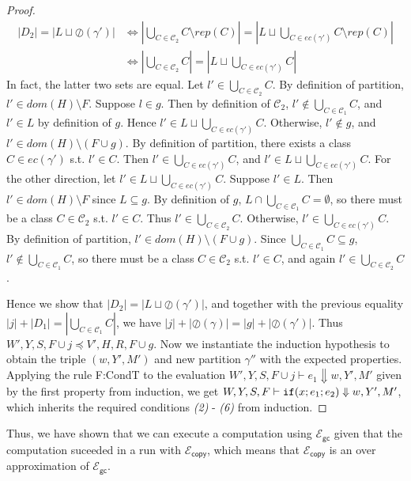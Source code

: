 \documentclass{easychair}
\newcommand{\ms}[1]{\ensuremath{\mathsf{#1}}}
\newcounter{rule}
\newcommand{\oh}[1]{\oslash(#1)}
\newcommand{\gcSem}{\ensuremath{\mathcal{E}_{\ms{gc}}}}
\newcommand{\copySem}{\ensuremath{\mathcal{E}_{\ms{copy}}}}
\theoremstyle{definition}
\begin{document}
\begin{proof}
\begin{align*}
      |D_2| = |L \sqcup \oh{\gamma'}|
      &\iff |\bigcup_{C  \in \mathcal{C}_2} C \setminus rep(C)| = 
			|L \sqcup \bigcup_{C \in ec(\gamma')} C \setminus rep(C)|\\
      &\iff |\bigcup_{C  \in \mathcal{C}_2} C| = 
        |L \sqcup \bigcup_{C \in ec(\gamma')} C|
  \end{align*}
		In fact, the latter two sets are equal. 
		Let $l' \in \bigcup_{C  \in \mathcal{C}_2} C$. 
		By definition of partition, $l' \in dom(H) \setminus F$. Suppose $ l \in g$. 
		Then by definition of $\mathcal{C}_2$, $l' \notin \bigcup_{C \in \mathcal{C}_1} C$, 
    and $l' \in L$ by definition of $g$. Hence 
    $l' \in L \sqcup \bigcup_{C \in ec(\gamma')} C$. 
		Otherwise,  $l' \notin g$, and $l' \in dom(H) \setminus (F \cup g)$. 
		By definition of partition, there exists a class $C \in ec(\gamma')$ s.t.
                $l' \in C$.
		Then $l' \in \bigcup_{C \in ec(\gamma')} C$, and
		$l' \in L \sqcup \bigcup_{C \in ec(\gamma')} C$.
		For the other direction, let $ l' \in L \sqcup \bigcup_{C \in ec(\gamma')} C$.
		Suppose $l' \in L$. Then $l' \in dom(H) \setminus F$ since $L \subseteq g$.
    By definition of $g$, $L \cap  \bigcup_{C \in \mathcal{C}_1} C = \emptyset$, so
    there must be a class $C \in \mathcal{C}_2$ s.t. $l' \in C$. Thus 
    $l' \in \bigcup_{C \in \mathcal{C}_2} C$.
    Otherwise, $l' \in \bigcup_{C \in ec(\gamma')} C$. 
    By definition of partition, $l' \in dom(H) \setminus (F \cup g)$. 
    Since $\bigcup_{C \in \mathcal{C}_1} C \subseteq g$, $l' \notin\bigcup_{C \in \mathcal{C}_1} C$,
    so there must be a class
    $C \in \mathcal{C}_2$ s.t. $l' \in C$, and again 
    $l' \in \bigcup_{C \in \mathcal{C}_2} C$.
    
    Hence we show that $|D_2| = |L \sqcup \oh{\gamma'}|$, and together with the previous 
    equality $|j| + |D_1| = |\bigcup_{C \in \mathcal{C}_1} C|$,
    we have $|j| + |\oh{\gamma}| = |g| + |\oh{\gamma'}|$. 
    Thus $W',Y,S,F \cup j \preceq V',H,R,F \cup g$. 
  Now we instantiate the induction hypothesis to obtain the triple $(w,Y',M')$ and 
  new partition $\gamma''$ with the expected properties. Applying the rule F:CondT 
  to the evaluation $W',Y,S,F \cup j \vdash e_1 \Downarrow w,Y',M'$ given by the first property
  from induction, we get $W,Y,S,F \vdash {\ensuremath{\mathtt{if}}}\mathtt{(}{x;e_1;e_2}\mathtt{)} \Downarrow w,Y',M'$,
  which inherits the required conditions \emph{(2)} - \emph{(6)} from induction.
\end{proof}

Thus, we have shown that we can execute a computation using 
\gcSem{} given that the computation suceeded in a run with \copySem{}, which means that  
\copySem{} is an over approximation of \gcSem{}.
\end{document}

